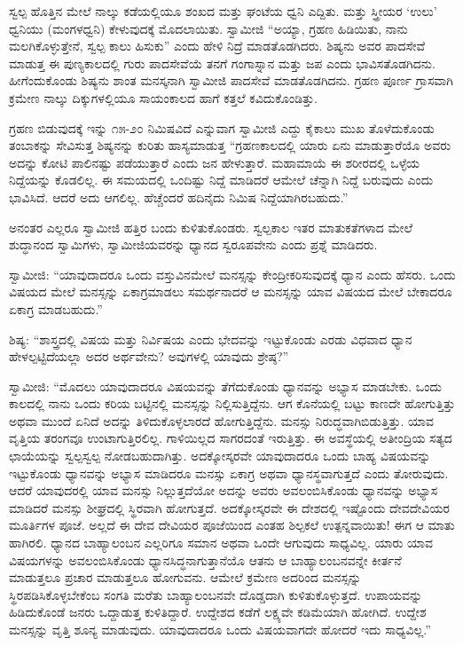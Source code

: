  ಸ್ವಲ್ಪ ಹೊತ್ತಿನ ಮೇಲೆ ನಾಲ್ಕು ಕಡೆಯಲ್ಲಿಯೂ ಶಂಖದ ಮತ್ತು ಘಂಟೆಯ ಧ್ವನಿ ಎದ್ದಿತು. ಮತ್ತು ಸ್ತ್ರೀಯರ ‘ಉಲು’ ಧ್ವನಿಯು (ಮಂಗಳಧ್ವನಿ) ಕೇಳುವುದಕ್ಕೆ ಮೊದಲಾಯಿತು. ಸ್ವಾಮೀಜಿ “ಅಯ್ಯಾ, ಗ್ರಹಣ ಹಿಡಿಯಿತು, ನಾನು ಮಲಗಿಕೊಳ್ಳುತ್ತೇನೆ, ಸ್ವಲ್ಪ ಕಾಲು ಹಿಸುಕು” ಎಂದು ಹೇಳಿ ನಿದ್ರೆ ಮಾಡತೊಡಗಿದರು. ಶಿಷ್ಯನು ಅವರ ಪಾದಸೇವೆ ಮಾಡುತ್ತ ಈ ಪುಣ್ಯಕಾಲದಲ್ಲಿ ಗುರು ಪಾದಸೇವೆಯೆ ತನಗೆ ಗಂಗಾಸ್ನಾನ ಮತ್ತು ಜಪ ಎಂದು ಭಾವಿಸತೊಡಗಿದನು. ಹೀಗೆಂದುಕೊಂಡು ಶಿಷ್ಯನು ಶಾಂತ ಮನಸ್ಕನಾಗಿ ಸ್ವಾಮೀಜಿ ಪಾದಸೇವೆ ಮಾಡತೊಡಗಿದನು. ಗ್ರಹಣ ಪೂರ್ಣ ಗ್ರಾಸವಾಗಿ ಕ್ರಮೇ‌ಣ ನಾಲ್ಕು ದಿಕ್ಕುಗಳಲ್ಲಿಯೂ ಸಾಯಂಕಾಲದ ಹಾಗೆ ಕತ್ತಲೆ ಕವಿದುಕೊಂಡಿತ್ತು. 

ಗ್ರಹಣ ಬಿಡುವುದಕ್ಕೆ ಇನ್ನು ೧೫-೨೦ ನಿಮಿಷವಿದೆ ಎನ್ನುವಾಗ ಸ್ವಾಮೀಜಿ ಎದ್ದು ಕೈಕಾಲು ಮುಖ ತೊಳೆದುಕೊಂಡು ತಂಬಾಕನ್ನು ಸೇವಿಸುತ್ತ ಶಿಷ್ಯನನ್ನು ಕುರಿತು ಹಾಸ್ಯಮಾಡುತ್ತ “ಗ್ರಹಣಕಾಲದಲ್ಲಿ ಯಾರು ಏನು ಮಾಡುತ್ತಾರೆಯೊ ಅವರು ಅದನ್ನು ಕೋಟಿ ಪಾಲಿನಷ್ಟು ಪಡೆಯುತ್ತಾರೆ ಎಂದು ಜನ ಹೇಳುತ್ತಾರೆ. ಮಹಾಮಾಯೆ ಈ ಶರೀರದಲ್ಲಿ ಒಳ್ಳೆಯ ನಿದ್ದೆಯನ್ನು ಕೊಡಲಿಲ್ಲ. ಈ ಸಮಯದಲ್ಲಿ ಒಂದಿಷ್ಟು ನಿದ್ದೆ ಮಾಡಿದರೆ ಆಮೇಲೆ ಚೆನ್ನಾಗಿ ನಿದ್ದೆ ಬರುವುದು ಎಂದು ಭಾವಿಸಿದೆ. ಆದರೆ ಅದು ಆಗಲಿಲ್ಲ. ಹೆಚ್ಚೆಂದರೆ ಹದಿನೈದು ನಿಮಿಷ ನಿದ್ದೆಯಾಗಿರಬಹುದು.” 

 ಅನಂತರ ಎಲ್ಲರೂ ಸ್ವಾಮೀಜಿ ಹತ್ತಿರ ಬಂದು ಕುಳಿತುಕೊಂಡರು. ಸ್ವಲ್ಪಕಾಲ ಇತರ ಮಾತುಕತೆಗಳಾದ ಮೇಲೆ ಶುದ್ಧಾನಂದ ಸ್ವಾಮಿಗಳು, ಸ್ವಾಮೀಜಿಯವರನ್ನು ಧ್ಯಾನದ ಸ್ವರೂಪವೇನು ಎಂದು ಪ್ರಶ್ನೆ ಮಾಡಿದರು. 

 ಸ್ವಾಮೀಜಿ: “ಯಾವುದಾದರೂ ಒಂದು ವಸ್ತುವಿನಮೇಲೆ ಮನಸ್ಸನ್ನು ಕೇಂದ್ರೀಕರಿಸುವುದಕ್ಕೆ ಧ್ಯಾನ ಎಂದು ಹೆಸರು. ಒಂದು ವಿಷಯದ ಮೇಲೆ ಮನಸ್ಸನ್ನು ಏಕಾಗ್ರಮಾಡಲು ಸಮರ್ಥನಾದರೆ ಆ ಮನಸ್ಸನ್ನು ಯಾವ ವಿಷಯದ ಮೇಲೆ ಬೇಕಾದರೂ ಏಕಾಗ್ರ ಮಾಡಬಹುದು.” 

 ಶಿಷ್ಯ: “ಶಾಸ್ತ್ರದಲ್ಲಿ ವಿಷಯ ಮತ್ತು ನಿರ್ವಿಷಯ ಎಂದು ಭೇದವನ್ನು ಇಟ್ಟುಕೊಂಡು ಎರಡು ವಿಧವಾದ ಧ್ಯಾನ ಹೇಳಲ್ಪಟ್ಟಿದೆಯಲ್ಲಾ ಅದರ ಅರ್ಥವೇನು? ಅವುಗಳಲ್ಲಿ ಯಾವುದು ಶ್ರೇಷ್ಠ?” 

 ಸ್ವಾಮೀಜಿ: “ಮೊದಲು ಯಾವುದಾದರೂ ವಿಷಯವನ್ನು ತೆಗೆದುಕೊಂಡು ಧ್ಯಾನವನ್ನು ಅಭ್ಯಾಸ ಮಾಡಬೇಕು. ಒಂದು ಕಾಲದಲ್ಲಿ ನಾನು ಒಂದು ಕರಿಯ ಬಟ್ಟಿನಲ್ಲಿ ಮನಸ್ಸನ್ನು ನಿಲ್ಲಿಸುತ್ತಿದ್ದೆನು. ಆಗ ಕೊನೆಯಲ್ಲಿ ಬಟ್ಟು ಕಾಣದೇ ಹೋಗುತ್ತಿತ್ತು ಅಥವಾ ಮುಂದೆ ಏನಿದೆ ಅದನ್ನು ತಿಳಿದುಕೊಳ್ಳಲಾರದೆ ಹೋಗುತ್ತಿದ್ದೆನು. ಮನಸ್ಸು ನಿರುದ್ಧವಾಗಿಬಿಡುತ್ತಿತ್ತು. ಯಾವ ವೃತ್ತಿಯ ತರಂಗವೂ ಉಂಟಾಗುತ್ತಿರಲಿಲ್ಲ. ಗಾಳಿಯಿಲ್ಲದ ಸಾಗರದಂತೆ ಇರುತ್ತಿತ್ತು. ಈ ಅವಸ್ಥೆಯಲ್ಲಿ ಅತೀಂದ್ರಿಯ ಸತ್ಯದ ಛಾಯೆಯನ್ನು ಸ್ವಲ್ಪಸ್ವಲ್ಪ ನೋಡಬಹುದಾಗಿತ್ತು. ಅದಕ್ಕೋಸ್ಕರವೇ ಯಾವುದಾದರೂ ಒಂದು ಬಾಹ್ಯ ವಿಷಯವನ್ನು ಇಟ್ಟುಕೊಂಡು ಧ್ಯಾನವನ್ನು ಅಭ್ಯಾಸ ಮಾಡಿದರೂ ಮನಸ್ಸು ಏಕಾಗ್ರ ಅಥವಾ ಧ್ಯಾನಸ್ಥವಾಗುತ್ತದೆ ಎಂದು ತೋರುವುದು. ಆದರೆ ಯಾವುದರಲ್ಲಿ ಯಾವ ಮನಸ್ಸು ನಿಲ್ಲುತ್ತದೆಯೋ ಅದನ್ನು ಅವರು ಅವಲಂಬಿಸಿಕೊಂಡು ಧ್ಯಾನವನ್ನು ಅಭ್ಯಾಸ ಮಾಡಿದರೆ ಮನಸ್ಸು ಶೀಘ್ರದಲ್ಲಿ ಸ್ಥಿರವಾಗಿ ಹೋಗುತ್ತದೆ. ಅದಕ್ಕೋಸ್ಕರವೇ ಈ ದೇಶದಲ್ಲಿ ಇಷ್ಟೊಂದು ದೇವದೇವಿಯರ ಮೂರ್ತಿಗಳ ಪೂಜೆ. ಅಲ್ಲದೆ ಈ ದೇವ ದೇವಿಯರ ಪೂಜೆಯಿಂದ ಎಂತಹ ಶಿಲ್ಪಕಲೆ ಉತ್ಪನ್ನವಾಯಿತು! ಈಗ ಆ ಮಾತು ಹಾಗಿರಲಿ. ಧ್ಯಾನದ ಬಾಹ್ಯಾಲಂಬನ ಎಲ್ಲರಿಗೂ ಸಮಾನ ಅಥವಾ ಒಂದೇ ಆಗುವುದು ಸಾಧ್ಯವಿಲ್ಲ. ಯಾರು ಯಾವ ವಿಷಯಗಳನ್ನು ಅವಲಂಬಿಸಿಕೊಂಡು ಧ್ಯಾನಸಿದ್ಧನಾಗುತ್ತಾನೆಯೊ ಆತನು ಆ ಬಾಹ್ಯಾಲಂಬನವನ್ನೇ ಕೀರ್ತನೆ ಮಾಡುತ್ತಲೂ ಪ್ರಚಾರ ಮಾಡುತ್ತಲೂ ಹೋಗುವನು. ಆಮೇಲೆ ಕ್ರಮೇಣ ಅದರಿಂದ ಮನಸ್ಸನ್ನು ಸ್ಥಿರಪಡಿಸಿಕೊಳ್ಳಬೇಕೆಂಬ ಸಂಗತಿ ಮರೆತು ಬಾಹ್ಯಾಲಂಬನವೇ ದೊಡ್ಡದಾಗಿ ಕುಳಿತುಕೊಳ್ಳುತ್ತದೆ. ಉಪಾಯವನ್ನು ಹಿಡಿದುಕೊಂಡೆ ಜನರು ಒದ್ದಾಡುತ್ತ ಕುಳಿತಿದ್ದಾರೆ. ಉದ್ದೇಶದ ಕಡೆಗೆ ಲಕ್ಷ್ಯವೇ ಕಡಿಮೆಯಾಗಿ ಹೋಗಿದೆ. ಉದ್ದೇಶ ಮನಸ್ಸನ್ನು ವೃತ್ತಿ ಶೂನ್ಯ ಮಾಡುವುದು. ಯಾವುದಾದರೂ ಒಂದು ವಿಷಯವಾಗದೇ ಹೋದರೆ ಇದು ಸಾಧ್ಯವಿಲ್ಲ.” 

